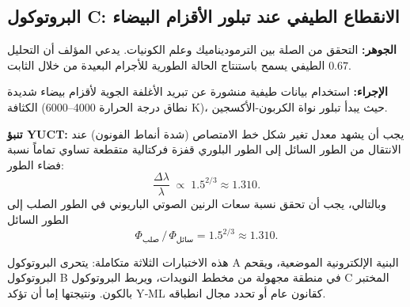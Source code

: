 \documentclass[11pt,a4paper]{article}
\begin{document}
	\subsection{البروتوكول C: الانقطاع الطيفي عند تبلور الأقزام البيضاء}
	\textbf{الجوهر:} التحقق من الصلة بين الترموديناميك وعلم الكونيات. يدعي المؤلف أن التحليل الطيفي يسمح باستنتاج الحالة الطورية للأجرام البعيدة من خلال الثابت \(0.67\).
	
	\textbf{الإجراء:} استخدام بيانات طيفية منشورة عن تبريد الأغلفة الجوية لأقزام بيضاء شديدة الكثافة (نطاق درجة الحرارة 4000–6000 K)، حيث يبدأ تبلور نواة الكربون-الأكسجين.
	
	\textbf{تنبؤ YUCT:} يجب أن يشهد معدل تغير شكل خط الامتصاص (شدة أنماط الفونون) عند الانتقال من الطور السائل إلى الطور البلوري قفزة فركتالية متقطعة تساوي تماماً نسبة فضاء الطور:
	\begin{equation}
		\frac{\Delta \lambda}{\lambda} \;\propto\; 1.5^{2/3} \approx 1.310 .
	\end{equation}
	وبالتالي، يجب أن تحقق نسبة سعات الرنين الصوتي الباريوني في الطور الصلب إلى الطور السائل
	\begin{equation}
		\Phi_{\text{صلب}} \,/\, \Phi_{\text{سائل}} = 1.5^{2/3} \approx 1.310 .
	\end{equation}
	
	هذه الاختبارات الثلاثة متكاملة: يتحرى البروتوكول A البنية الإلكترونية الموضعية، ويقحم البروتوكول B في منطقة مجهولة من مخطط النويدات، ويربط البروتوكول C المختبر بالكون. ونتيجتها إما أن تؤكد Y‑ML كقانون عام أو تحدد مجال انطباقه.
	
\end{document}
